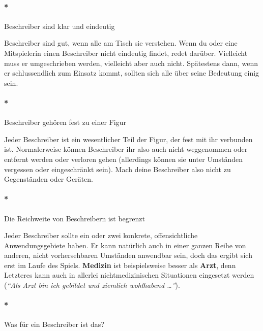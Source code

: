 \documentclass[]{article}
\let\oldparagraph\paragraph
\renewcommand{\paragraph}[1]{\oldparagraph{#1}\mbox{}}
\begin{document}
\paragraph*{Beschreiber sind klar und
eindeutig}\label{beschreiber-sind-klar-und-eindeutig}

Beschreiber sind gut, wenn alle am Tisch sie verstehen. Wenn du oder
eine Mitspielerin einen Beschreiber nicht eindeutig findet, redet
darüber. Vielleicht muss er umgeschrieben werden, vielleicht aber auch
nicht. Spätestens dann, wenn er schlussendlich zum Einsatz kommt,
sollten sich alle über seine Bedeutung einig sein.

\paragraph*{Beschreiber gehören fest zu einer
Figur}\label{beschreiber-gehuxf6ren-fest-zu-einer-figur}

Jeder Beschreiber ist ein wesentlicher Teil der Figur, der fest mit ihr
verbunden ist. Normalerweise können Beschreiber ihr also auch nicht
weggenommen oder entfernt werden oder verloren gehen (allerdings können
sie unter Umständen vergessen oder eingeschränkt sein). Mach deine
Beschreiber also nicht zu Gegenständen oder Geräten.

\paragraph*{Die Reichweite von Beschreibern ist
begrenzt}\label{die-reichweite-von-beschreibern-ist-begrenzt}

Jeder Beschreiber sollte ein oder zwei konkrete, offensichtliche
Anwendungsgebiete haben. Er kann natürlich auch in einer ganzen Reihe
von anderen, nicht vorhersehbaren Umständen anwendbar sein, doch das
ergibt sich erst im Laufe des Spiels. \textbf{Medizin} ist
beispielsweise besser als \textbf{Arzt}, denn Letzteres kann auch in
allerlei nichtmedizinischen Situationen eingesetzt werden (\emph{``Als
Arzt bin ich gebildet und ziemlich wohlhabend \ldots{}''}).

\paragraph*{Was für ein Beschreiber ist
das?}\label{was-fuxfcr-ein-beschreiber-ist-das}
\end{document}
